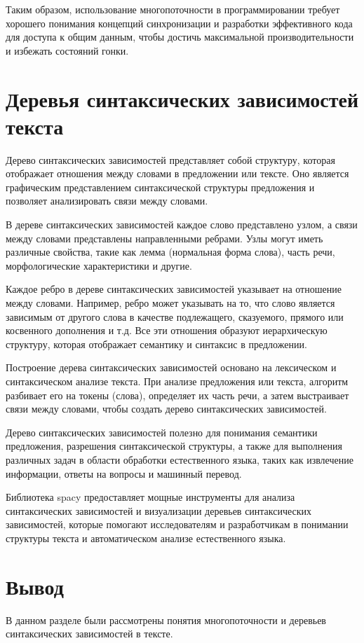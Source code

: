 Таким образом, использование многопоточности в программировании требует хорошего понимания концепций синхронизации и разработки эффективного кода для доступа к общим данным, чтобы достичь максимальной производительности и избежать состояний гонки.

\section[Деревья синтаксических зависимостей текста]{Деревья синтаксических зависимостей\\ текста}

Дерево синтаксических зависимостей представляет собой структуру, которая отображает отношения между словами в предложении или тексте. Оно является графическим представлением синтаксической структуры предложения и позволяет анализировать связи между словами.

В дереве синтаксических зависимостей каждое слово представлено узлом, а связи между словами представлены направленными ребрами. Узлы могут иметь различные свойства, такие как лемма (нормальная форма слова), часть речи, морфологические характеристики и другие.

Каждое ребро в дереве синтаксических зависимостей указывает на отношение между словами. Например, ребро может указывать на то, что слово является зависимым от другого слова в качестве подлежащего, сказуемого, прямого или косвенного дополнения и т.д. Все эти отношения образуют иерархическую структуру, которая отображает семантику и синтаксис в предложении.

Построение дерева синтаксических зависимостей основано на лексическом и синтаксическом анализе текста. При анализе предложения или текста, алгоритм разбивает его на токены (слова), определяет их часть речи, а затем выстраивает связи между словами, чтобы создать дерево синтаксических зависимостей.

Дерево синтаксических зависимостей полезно для понимания семантики предложения, разрешения синтаксической структуры, а также для выполнения различных задач в области обработки естественного языка, таких как извлечение информации, ответы на вопросы и машинный перевод.

Библиотека spacy предоставляет мощные инструменты для анализа синтаксических зависимостей и визуализации деревьев синтаксических зависимостей, которые помогают исследователям и разработчикам в понимании структуры текста и автоматическом анализе естественного языка.

\section*{Вывод}

В данном разделе были рассмотрены понятия многопоточности и деревьев синтаксических зависимостей в тексте.